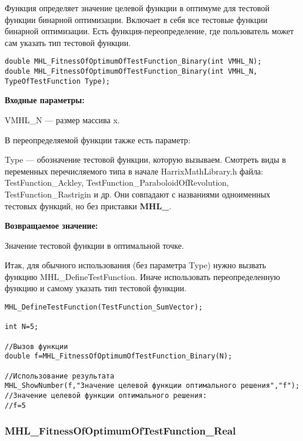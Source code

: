 \documentclass[a4paper,12pt]{article}
\begin{document}
Функция определяет значение целевой функции в оптимуме для тестовой функции бинарной оптимизации. Включает в себя все тестовые функции бинарной оптимизации. Есть функция-переопределение, где пользователь может сам указать тип тестовой функции.


\begin{lstlisting}[label=code_syntax_MHL_FitnessOfOptimumOfTestFunction_Binary,caption=Синтаксис]
double MHL_FitnessOfOptimumOfTestFunction_Binary(int VMHL_N);
double MHL_FitnessOfOptimumOfTestFunction_Binary(int VMHL_N, TypeOfTestFunction Type);
\end{lstlisting}

\textbf{Входные параметры:}

VMHL\_N --- размер массива x.

В переопределяемой функции также есть параметр:
  
Type --- обозначение тестовой функции, которую вызываем.
Смотреть виды в переменных перечисляемого типа в начале HarrixMathLibrary.h файла: TestFunction\_Ackley, TestFunction\_ParaboloidOfRevolution, TestFunction\_Rastrigin и др. Они совпадают с названиями одноименных тестовых функций, но без приставки \textbf{MHL\_}.

\textbf{Возвращаемое значение:}
 
Значение тестовой функции в оптимальной точке.

Итак, для обычного использования (без параметра Type) нужно вызвать функцию MHL\_DefineTestFunction. Иначе использовать переопределенную функцию и самому указать тип тестовой функции.


\begin{lstlisting}[label=code_use_MHL_FitnessOfOptimumOfTestFunction_Binary,caption=Пример использования]
MHL_DefineTestFunction(TestFunction_SumVector);

int N=5;

//Вызов функции
double f=MHL_FitnessOfOptimumOfTestFunction_Binary(N);

//Использование результата
MHL_ShowNumber(f,"Значение целевой функции оптимального решения","f");
//Значение целевой функции оптимального решения:
//f=5
\end{lstlisting}

\subsubsection{MHL\_FitnessOfOptimumOfTestFunction\_Real}\label{MHL_FitnessOfOptimumOfTestFunction_Real}
\end{document}
